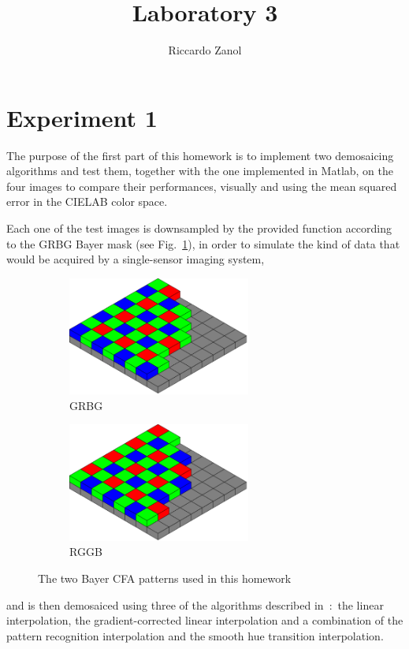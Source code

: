\documentclass[a4paper,oneside]{article}
\author{Riccardo Zanol}
\title{Laboratory 3}
\begin{document}
\matlabcodeconfig
\maketitle
\section*{Experiment 1} 
The purpose of the first part of this homework is to implement two
demosaicing algorithms and test them, together with the one
implemented in Matlab, on the four images  to
compare their performances, visually and using the mean squared error
in the CIELAB color space.

Each one of the test images is downsampled by the provided function
 according to the GRBG Bayer mask (see
Fig.~\ref{fig:bayer_grbg}), in order to simulate the kind of data that
would be acquired by a single-sensor imaging system,
\begin{figure}[htbp]
  \centering
  \begin{subfigure}{0.5\textwidth}
    \centering
    \includegraphics[width=0.66\textwidth]{include_imgs/bayer_grbg}
    \caption{GRBG}
    \label{fig:bayer_grbg}
  \end{subfigure}%
  \begin{subfigure}{0.5\textwidth}
    \centering
    \includegraphics[width=0.66\textwidth]{include_imgs/bayer_rggb}
    \caption{RGGB}
    \label{fig:bayer_rggb}
  \end{subfigure}
  \caption{The two Bayer CFA patterns used in this homework}
\end{figure}
and is then demosaiced using three of the algorithms described
in~\cite{demosaic_alg}:~the linear interpolation, the
gradient-corrected linear interpolation and a combination of the
pattern recognition interpolation and the smooth hue transition
interpolation.
\end{document}
